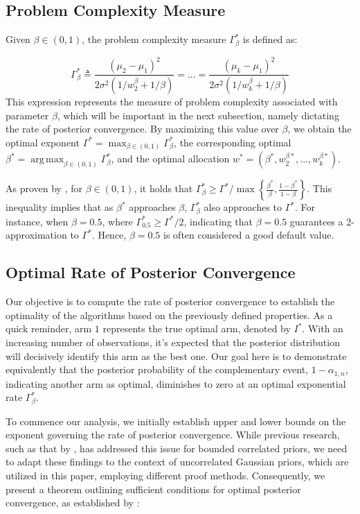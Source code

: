 \documentclass[a4paper, 12pt]{article}
\DeclareMathOperator{\argmax}{arg\,max}
\theoremstyle{definition}
\begin{document}
\subsection{Problem Complexity Measure}

Given $\beta\in(0,1)$, the problem complexity measure $\Gamma_\beta^*$ is defined as:

\[
\Gamma_\beta^* \triangleq \frac{(\mu_2-\mu_1)^2}{2\sigma^2 \left(1/w_2^\beta + 1/\beta \right)} = ... = \frac{(\mu_k-\mu_1)^2}{2\sigma^2 \left(1/w_k^\beta + 1/\beta \right)}
\]
This expression represents the measure of problem complexity associated with parameter $\beta$, which will be important in the next subsection, namely dictating the rate of posterior convergence. By maximizing this value over $\beta$, we obtain the optimal exponent $\Gamma^* = \max_{\beta\in(0,1)}\Gamma_\beta^*$, the corresponding optimal $\beta^* = \argmax_{\beta\in(0,1)}\Gamma_\beta^*$, and the optimal allocation $w^* = \left(\beta^*, w_2^{\beta*}, ..., w_k^{\beta*}\right)$.

As proven by \cite{toptwo}, for $\beta\in(0,1)$, it holds that $\Gamma_\beta^* \geq \Gamma^*/\max{}\left\{\frac{\beta^*}{\beta},\frac{1-\beta^*}{1-\beta}\right\}$. This inequality implies that as $\beta^*$ approaches $\beta$, $\Gamma_\beta^*$ also approaches to $\Gamma^*$. For instance, when $\beta = 0.5$, where $\Gamma_{0.5}^* \geq \Gamma^*/2$, indicating that $\beta=0.5$ guarantees a 2-approximation to $\Gamma^*$. Hence, $\beta=0.5$ is often considered a good default value.


\subsection{Optimal Rate of Posterior Convergence}
Our objective is to compute the rate of posterior convergence to establish the optimality of the algorithms based on the previously defined properties. As a quick reminder, arm $1$ represents the true optimal arm, denoted by $I^*$. With an increasing number of observations, it's expected that the posterior distribution will decisively identify this arm as the best one. Our goal here is to demonstrate equivalently that the posterior probability of the complementary event, $1-\alpha_{1,n}$, indicating another arm as optimal, diminishes to zero at an optimal exponential rate $\Gamma_\beta^*$.

To commence our analysis, we initially establish upper and lower bounds on the exponent governing the rate of posterior convergence. While previous research, such as that by \cite{toptwo}, has addressed this issue for bounded correlated priors, we need to adapt these findings to the context of uncorrelated Gaussian priors, which are utilized in this paper, employing different proof methods. Consequently, we present a theorem outlining sufficient conditions for optimal posterior convergence, as established by \cite{ttei}:
\end{document}
